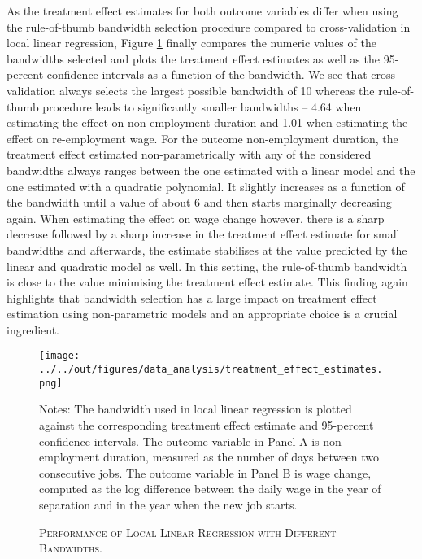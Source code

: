 As the treatment effect estimates for both outcome variables differ when using the rule-of-thumb bandwidth selection procedure compared to cross-validation in local linear regression, Figure \ref{fig: bw_perf} finally compares the numeric values of the bandwidths selected and plots the treatment effect estimates as well as the 95-percent confidence intervals as a function of the bandwidth. We see that cross-validation always selects the largest possible bandwidth of 10 whereas the rule-of-thumb procedure leads to significantly smaller bandwidths -- 4.64 when estimating the effect on non-employment duration and 1.01 when estimating the effect on re-employment wage. For the outcome non-employment duration, the treatment effect estimated non-parametrically with any of the considered bandwidths always ranges between the one estimated with a linear model and the one estimated with a quadratic polynomial. It slightly increases as a function of the bandwidth until a value of about 6 and then starts marginally decreasing again. When estimating the effect on wage change however, there is a sharp decrease followed by a sharp increase in the treatment effect estimate for small bandwidths and afterwards, the estimate stabilises at the value predicted by the linear and quadratic model as well. In this setting, the rule-of-thumb bandwidth is close to the value minimising the treatment effect estimate. This finding again highlights that bandwidth selection has a large impact on treatment effect estimation using non-parametric models and an appropriate choice is a crucial ingredient.

\begin{figure}[H]
	\centering
	\texttt{[image: ../../out/figures/data\_analysis/treatment\_effect\_estimates.png]}
	\caption{\textsc{Performance of Local Linear Regression with Different Bandwidths.}}
	\label{fig: bw_perf}
	\medskip
	\justify
	\footnotesize{Notes: The bandwidth used in local linear regression is plotted against the corresponding treatment effect estimate and 95-percent confidence intervals. The outcome variable in Panel A is non-employment duration, measured as the number of days between two consecutive jobs. The outcome variable in Panel B is wage change, computed as the log difference between the daily wage in the year of separation and in the year when the new job starts.}
\end{figure}
